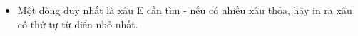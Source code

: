\begin{itemize}
	\item     Một dòng duy nhất là xâu E cần tìm - nếu có nhiều xâu thỏa, hãy in ra xâu có thứ tự từ điển nhỏ nhất.   
\end{itemize}